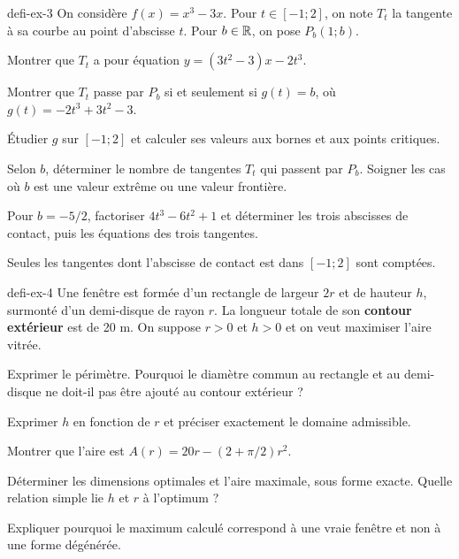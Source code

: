 \begin{blocEdition}{defi-ex-3}
On considère $f(x)=x^3-3x$. Pour $t\in[-1;2]$, on note $T_t$ la tangente
à sa courbe au point d'abscisse $t$. Pour $b\in\mathbb{R}$, on pose $P_b(1;b)$.
\begin{questions}
\item Montrer que $T_t$ a pour équation $y=(3t^2-3)x-2t^3$.
\item Montrer que $T_t$ passe par $P_b$ si et seulement si $g(t)=b$,
où $g(t)=-2t^3+3t^2-3$.
\item Étudier $g$ sur $[-1;2]$ et calculer ses valeurs aux bornes et aux points critiques.
\item Selon $b$, déterminer le nombre de tangentes $T_t$ qui passent par $P_b$.
Soigner les cas où $b$ est une valeur extrême ou une valeur frontière.
\item Pour $b=-5/2$, factoriser $4t^3-6t^2+1$ et déterminer les trois
abscisses de contact, puis les équations des trois tangentes.
\end{questions}
Seules les tangentes dont l'abscisse de contact est dans $[-1;2]$ sont comptées.
\label{figedition-defi-ex-3-1}
\end{blocEdition}

\begin{blocEdition}{defi-ex-4}
Une fenêtre est formée d'un rectangle de largeur $2r$ et de hauteur $h$, surmonté
d'un demi-disque de rayon $r$. La longueur totale de son \textbf{contour extérieur} est de 20 m.
On suppose $r>0$ et $h>0$ et on veut maximiser l'aire vitrée.
\begin{questions}
\item Exprimer le périmètre. Pourquoi le diamètre commun au rectangle et au demi-disque
ne doit-il pas être ajouté au contour extérieur ?
\item Exprimer $h$ en fonction de $r$ et préciser exactement le domaine admissible.
\item Montrer que l'aire est $A(r)=20r-(2+\pi/2)r^2$.
\item Déterminer les dimensions optimales et l'aire maximale, sous forme exacte.
Quelle relation simple lie $h$ et $r$ à l'optimum ?
\item Expliquer pourquoi le maximum calculé correspond à une vraie fenêtre et non à une forme dégénérée.
\end{questions}
\label{figedition-defi-ex-4-1}
\end{blocEdition}

